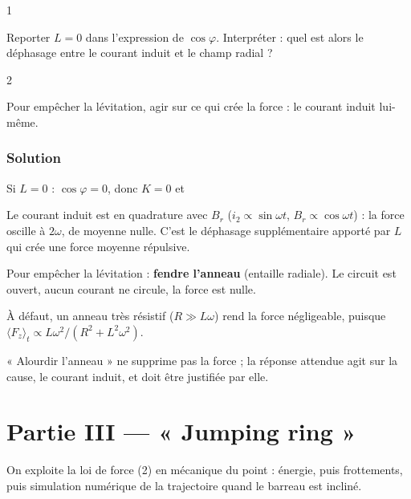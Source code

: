 \documentclass[11pt,a4paper]{article}
\newcommand{\equationajustee}[1]{%
  \sbox{\boiteequation}{$\displaystyle #1$}%
  \ifdim\wd\boiteequation>\linewidth
    \[\resizebox{\linewidth}{!}{\usebox{\boiteequation}}\]%
  \else
    \[#1\]%
  \fi}
\begin{document}
\begin{indication}{1}

Reporter \(L=0\) dans l'expression de \(\cos\varphi\). Interpréter : quel est alors le déphasage entre le courant induit et le champ radial ?

\end{indication}

\begin{indication}{2}

Pour empêcher la lévitation, agir sur ce qui crée la force : le courant induit lui-même.

\end{indication}

\hypertarget{solution-12}{%
\subsubsection{Solution}\label{solution-12}}

Si \(L=0\) : \(\cos\varphi=0\), donc \(K=0\) et

\equationajustee{\boxed{\langle F_z\rangle_t=0}}

Le courant induit est en quadrature avec \(B_r\) (\(i_2\propto\sin\omega t\), \(B_r\propto\cos\omega t\)) : la force oscille à \(2\omega\), de moyenne nulle. C'est le déphasage supplémentaire apporté par \(L\) qui crée une force moyenne répulsive.

Pour empêcher la lévitation : \textbf{fendre l'anneau} (entaille radiale). Le circuit est ouvert, aucun courant ne circule, la force est nulle.

À défaut, un anneau très résistif (\(R\gg L\omega\)) rend la force négligeable, puisque \(\langle F_z\rangle_t\propto L\omega^2/(R^2+L^2\omega^2)\).

\begin{piege}

« Alourdir l'anneau » ne supprime pas la force ; la réponse attendue agit sur la cause, le courant induit, et doit être justifiée par elle.

\end{piege}

\hypertarget{partie-iii-jumping-ring}{%
\section{Partie III --- « Jumping ring »}\label{partie-iii-jumping-ring}}

On exploite la loi de force (2) en mécanique du point : énergie, puis frottements, puis simulation numérique de la trajectoire quand le barreau est incliné.
\end{document}

